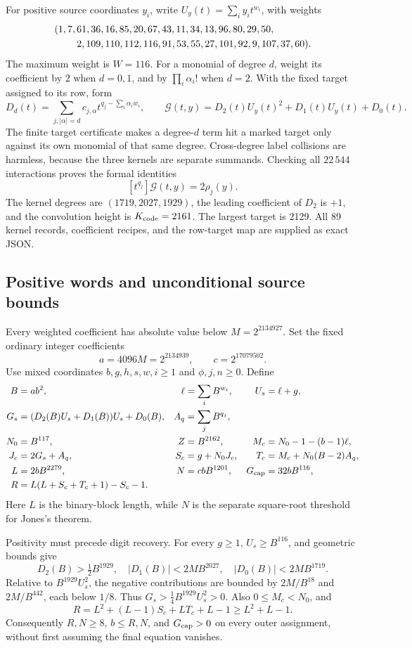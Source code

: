 For positive source coordinates \(y_i\), write
\(U_y(t)=\sum_i y_i t^{w_i}\), with weights
\begin{align*}
 &(1,7,61,36,16,85,20,67,43,11,34,13,96,80,29,50,\\
 &\hspace{8mm}2,109,110,112,116,91,53,55,27,101,92,9,107,37,60).
\end{align*}
The maximum weight is \(W=116\).  For a monomial of degree \(d\), weight its
coefficient by 2 when \(d=0,1\), and by \(\prod_i\alpha_i!\) when \(d=2\).
With the fixed target assigned to its row, form
\[
 D_d(t)=\sum_{j,|\alpha|=d}c_{j,\alpha}
 t^{q_j-\sum_i\alpha_iw_i},\qquad
 \mathcal G(t,y)=D_2(t)U_y(t)^2+D_1(t)U_y(t)+D_0(t).
\]
The finite target certificate makes a degree-\(d\) term hit a marked target
only against its own monomial of that same degree.  Cross-degree label
collisions are harmless, because the three kernels are separate summands.
Checking all \(22\,544\) interactions proves the formal identities
\[
 [t^{q_j}]\mathcal G(t,y)=2\rho_j(y).
\]
The kernel degrees are \((1719,2027,1929)\), the leading coefficient of
\(D_2\) is \(+1\), and the convolution height is
\(K_{\rm code}=2161\).  The largest target is 2129.  All 89 kernel records,
coefficient recipes, and the row-target map are supplied as exact JSON.

\subsection{Positive words and unconditional source bounds}
Every weighted coefficient has absolute value below \(M=2^{2134927}\).
Set the fixed ordinary integer coefficients
\[
 a=4096M=2^{2134939},\qquad c=2^{17079502}.
\]
Use mixed coordinates \(b,g,h,s,w,i\ge1\) and \(\phi,j,n\ge0\).  Define
\begin{align*}
 B&=ab^2,&\ell&=\sum_i B^{w_i},& U_s&=\ell+g,\\
 G_s&=(D_2(B)U_s+D_1(B))U_s+D_0(B),&
 A_q&=\sum_j B^{q_j},\\
 N_0&=B^{117},& Z&=B^{2162},&
 M_c&=N_0-1-(b-1)\ell,\\
 J_c&=2G_s+A_q,&S_c&=g+N_0J_c,&
 T_c&=M_c+N_0(B-2)A_q,\\
 L&=2bB^{2279},&N&=cbB^{1201},&G_{\rm cap}&=32bB^{116},\\
 R&=L(L+S_c+T_c+1)-S_c-1.&&&
\end{align*}
Here \(L\) is the binary-block length, while \(N\) is the separate
square-root threshold for Jones's theorem.

Positivity must precede digit recovery.  For every \(g\ge1\),
\(U_s\ge B^{116}\), and geometric bounds give
\[
 D_2(B)>\tfrac12B^{1929},\quad
 |D_1(B)|<2MB^{2027},\quad |D_0(B)|<2MB^{1719}.
\]
Relative to \(B^{1929}U_s^2\), the negative contributions are bounded by
\(2M/B^{18}\) and \(2M/B^{442}\), each below \(1/8\).  Thus
\(G_s>\tfrac14B^{1929}U_s^2>0\).  Also \(0\le M_c<N_0\), and
\[
 R=L^2+(L-1)S_c+LT_c+L-1\ge L^2+L-1.
\]
Consequently \(R,N\ge8\), \(b\le R,N\), and \(G_{\rm cap}>0\)
on every outer assignment, without first assuming the final equation vanishes.

